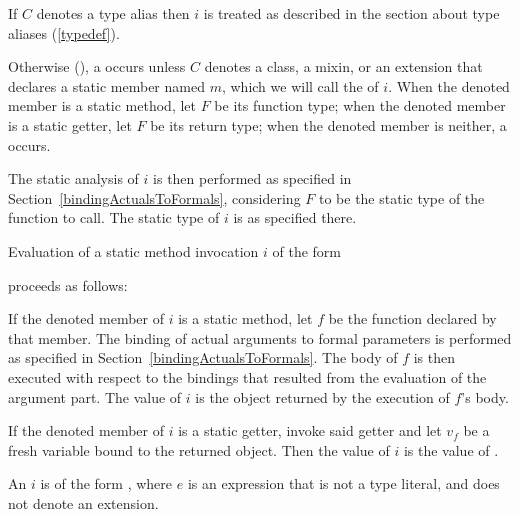 \documentclass[makeidx]{article}
\begin{document}
{

\LMHash{}%
If $C$ denotes a type alias then $i$ is treated as described in
the section about type aliases
(\ref{typedef}).

\LMHash{}%
Otherwise
(),
a  occurs
unless $C$ denotes a class, a mixin, or an extension that declares
a static member named $m$,
which we will call the
of $i$.
%
When the denoted member is a static method, let $F$ be its function type;
when the denoted member is a static getter, let $F$ be its return type;
when the denoted member is neither, a  occurs.

\LMHash{}%
The static analysis of $i$ is then performed
as specified in Section~\ref{bindingActualsToFormals},
considering $F$ to be the static type of the function to call.
The static type of $i$ is as specified there.

\LMHash{}%
%
Evaluation of a static method invocation $i$ of the form

\noindent
{}

\noindent
proceeds as follows:

\LMHash{}%
If the denoted member of $i$ is a static method,
let $f$ be the function declared by that member.
The binding of actual arguments to formal parameters is performed
as specified in Section~\ref{bindingActualsToFormals}.
The body of $f$ is then executed with respect to the bindings
that resulted from the evaluation of the argument part.
The value of $i$ is the object returned by the execution of $f$'s body.

\LMHash{}%
If the denoted member of $i$ is a static getter,
invoke said getter and let $v_f$ be
a fresh variable bound to the returned object.
Then the value of $i$ is the value of
.
\EndCase

\LMHash{}%
An 
%
$i$ is of the form
,
where $e$ is an expression that is not a type literal,
and does not denote an extension.

}
\end{document}
